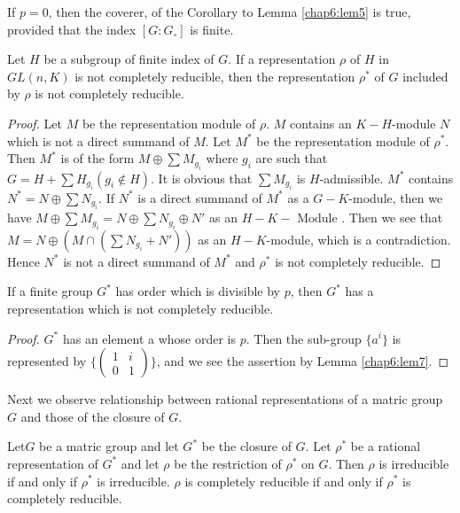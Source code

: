 \begin{coro*}
  If $p = 0$, then the coverer, of the Corollary to Lemma
  \ref{chap6:lem5} is true,   provided that the index $[G:G_{\circ}]$
  is finite.  
\end{coro*}

\begin{lem}\label{chap6:lem7}%
  Let $H$ be a subgroup of finite index of $G$.  If a representation
  $\rho$ of  $H$ in $GL (n, K)$ is not completely reducible,  then the
  representation $\rho^\ast$ of  $G$ included by  $\rho$ is not
  completely reducible. 
\end{lem}

\begin{proof}
  Let $M$ be the representation module of $\rho$.  $M$ contains an
  $K-H$-module $N$ which is not a direct summand of $M$.  Let $M^\ast$
  be the representation module of $\rho^\ast$.  Then $M^\ast$ is of
  the form $M \oplus \sum M_{g_i}$ where $g_i$ are such that  $G = H +
  \sum H_{g_i}(g_i \notin H)$. It is obvious that $\sum M_{g_i}$ is
  $H$-admissible.  $M^\ast$ contains $N^\ast = N \oplus \sum N_{g_i}$.
  If $N^\ast$ is a direct summand of $M^\ast$ as a  $G-K$-module,
  then we have $M \oplus \sum M_{g_i}= N \oplus \sum N_{g_i} \oplus
  N'$ as an $H-K-\text { Module }$.  Then we see that $ M = N \oplus
  (M \cap ( \sum N_{g_i}+ N'))$ as an $H-K$-module, which is a
  contradiction. Hence $N^\ast$ is not a direct summand of $M^\ast$
  and $\rho^\ast$ is not completely reducible.   
\end{proof}

\begin{coro*}
  If a finite group $G^\ast$ has order which is divisible by  $p$,
  then  $G^\ast$ has a representation which is not completely
  reducible.
\end{coro*}

\begin{proof} 
  $G^\ast$ has an element a whose order is $p$.  Then the sub-group
  $\{a^i\}$ is represented by $\bigg\{\begin{pmatrix} 1 & i \\ 0 &
  1 \end{pmatrix}\bigg\}$, and we see the assertion by Lemma \ref{chap6:lem7}. 
\end{proof}

Next we observe relationship between rational representations of a
matric group $G$ and those of the closure of $G$. 

\begin{lem}\label{chap6:lem8}%
  Let\pageoriginale $G$ be a matric group and let $G^\ast$ be the
  closure of $G$.  Let 
  $\rho^\ast$ be a rational representation of $G^\ast$ and let $\rho$ be
  the restriction of $\rho^\ast$ on $G$.  Then $\rho$ is irreducible
  if and only if $\rho^\ast$ is irreducible.  $\rho$ is completely
  reducible if and only if $\rho^\ast$ is completely reducible.   
\end{lem}

